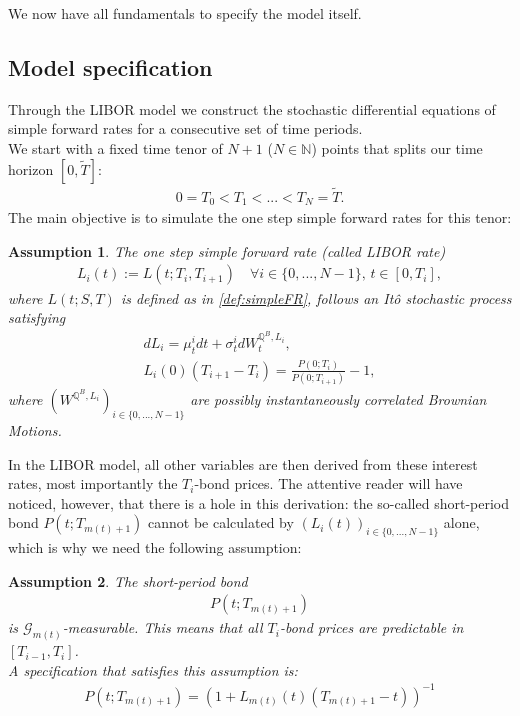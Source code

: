 \documentclass[12pt]{article}
\newtheorem{assumption}{Assumption}[section]
\begin{document}
	We now have all fundamentals to specify the model itself.
	
	\subsection{Model specification}\label{sec:libModel}
	Through the LIBOR model we construct the stochastic differential equations of simple forward rates for a consecutive set of time periods.\\
	We start with a fixed time tenor of $N+1$ ($N \in \mathbb{N}$) points that splits our time horizon $[0,\tilde{T}]$:
	\begin{align*}
		0 = T_0 < T_1 < ... < T_N = \tilde{T}.
	\end{align*}
	The main objective is to simulate the one step simple forward rates for this tenor:
	\begin{assumption}\label{as:LIBORisItoProcess}
		The one step simple forward rate (called LIBOR rate)
		\begin{align*}
			L_i(t) := L(t;T_i, T_{i+1}) \quad \forall i \in \{0, ..., N-1\}\text{, } t\in[0,T_i],
		\end{align*}
		where $L(t;S, T)$ is defined as in \cref{def:simpleFR},
		follows an Itô stochastic process satisfying
		\begin{align}
			dL_i = \mu^i_t dt + \sigma^i_t dW^{\mathbb{Q}^B, L_i}_t,\label{eq:LMMSDE}\\
			L_i(0)(T_{i+1} - T_i) = \frac{P(0;T_i)}{P(0;T_{i+1})} - 1,
		\end{align}
		where $(W^{\mathbb{Q}^B, L_i})_{i\in \{0, ..., N-1\}}$ are possibly instantaneously correlated Brownian Motions.
	\end{assumption}
	In the LIBOR model, all other variables are then derived from these interest rates, most importantly the $T_i$-bond prices. The attentive reader will have noticed, however, that there is a hole in this derivation: the so-called short-period bond $P(t;T_{m(t)+1})$ cannot be calculated by $\left(L_i(t)\right)_{i\in\{0, ..., N-1\}}$ alone, which is why we need the following assumption:
	\begin{assumption}\label{as:LMMShortPeriodBond}
		The short-period bond
		\begin{align*}
			P(t;T_{m(t)+1})
		\end{align*}
		is $\mathcal{G}_{m(t)}$-measurable. This means that all $T_i$-bond prices are predictable in $[T_{i-1},T_i]$.\\
		A specification that satisfies this assumption is:
		\begin{align*}
			P(t;T_{m(t)+1}) = \left(1 + L_{m(t)}(t)\left(T_{m(t)+1} - t\right)\right)^{-1}
		\end{align*}
	\end{assumption}
\end{document}
